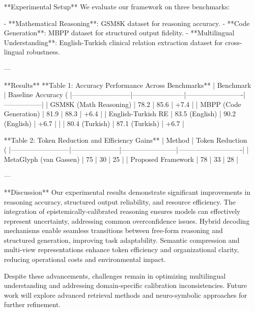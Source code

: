 **Experimental Setup**  
We evaluate our framework on three benchmarks:  

- **Mathematical Reasoning**: GSM8K dataset for reasoning accuracy.  
- **Code Generation**: MBPP dataset for structured output fidelity.  
- **Multilingual Understanding**: English-Turkish clinical relation extraction dataset for cross-lingual robustness.  

---

**Results**  
**Table 1: Accuracy Performance Across Benchmarks**  
| Benchmark                | Baseline Accuracy (%
|--------------------------|-----------------------|-------------------------|-----------------|  
| GSM8K (Math Reasoning)   | 78.2                 | 85.6                   | +7.4            |  
| MBPP (Code Generation)   | 81.9                 | 88.3                   | +6.4            |  
| English-Turkish RE       | 83.5 (English)       | 90.2 (English)         | +6.7            |  
|                          | 80.4 (Turkish)       | 87.1 (Turkish)         | +6.7            |  

**Table 2: Token Reduction and Efficiency Gains**  
| Method                   | Token Reduction (%
|--------------------------|---------------------|------------------------|----------------------------|  
| MetaGlyph (van Gassen)   | 75                  | 30                     | 25                         |  
| Proposed Framework       | 78                  | 33                     | 28                         |  

---

**Discussion**  
Our experimental results demonstrate significant improvements in reasoning accuracy, structured output reliability, and resource efficiency. The integration of epistemically-calibrated reasoning ensures models can effectively represent uncertainty, addressing common overconfidence issues. Hybrid decoding mechanisms enable seamless transitions between free-form reasoning and structured generation, improving task adaptability. Semantic compression and multi-view representations enhance token efficiency and organizational clarity, reducing operational costs and environmental impact.  

Despite these advancements, challenges remain in optimizing multilingual understanding and addressing domain-specific calibration inconsistencies. Future work will explore advanced retrieval methods and neuro-symbolic approaches for further refinement.  

